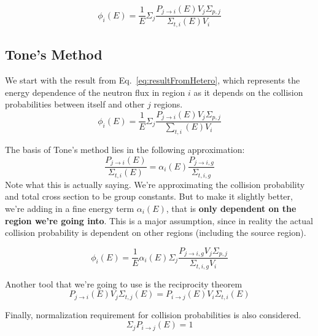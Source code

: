 \documentclass[10pt]{article}
\begin{document}
\begin{equation}\phi_{i}(E)=\frac{1}{E}\Sigma_j\frac{P_{j\rightarrow i}(E)V_{j}\Sigma_{p,j}}{\Sigma_{t,i}(E)V_{i}}\label{eq:resultFromHetero}\end{equation}




\subsection*{Tone's Method}
We start with the result from Eq.~\ref{eq:resultFromHetero}, which represents the energy dependence of the neutron flux in region $i$ as it depends on the collision probabilities between itself and other $j$ regions.
\begin{equation}\phi_{i}(E)=\frac{1}{E}\Sigma_j\frac{P_{j\rightarrow i}(E)V_{j}\Sigma_{p,j}}{\sum\limits_{t,i}(E)V_{i}}\end{equation}

The basis of Tone's method lies in the following approximation:
\begin{equation}\frac{P_{j\rightarrow i}(E)}{\Sigma_{t,i}(E)}=\alpha_{i}(E)\frac{P_{j\rightarrow i,g}}{\Sigma_{t,i,g}}\end{equation}
Note what this is actually saying. We're approximating the collision probability and total cross section to be group constants. But to make it slightly better, we're adding in a fine energy term $\alpha_i(E)$, that is \textbf{only dependent on the region we're going into}. This is a major assumption, since in reality the actual collision probability is dependent on other regions (including the source region).

\begin{equation}\phi_{i}(E)=\frac{1}{E}\alpha_{i}(E)\Sigma_j\frac{P_{j\rightarrow i,g}V_{j}\Sigma_{p,j}}{\Sigma_{t,i,g}V_{i}}\end{equation}

\begin{equation}~\end{equation}
Another tool that we're going to use is the reciprocity theorem
\begin{equation}P_{j\rightarrow i}(E)V_{j}\Sigma_{t,j}(E)=P_{i\rightarrow j}(E)V_{i}\Sigma_{t,i}(E)\end{equation}

Finally, normalization requirement for collision probabilities is also considered.
\begin{equation}\Sigma_{j}P_{i\rightarrow j}(E)=1\end{equation}
\end{document}
